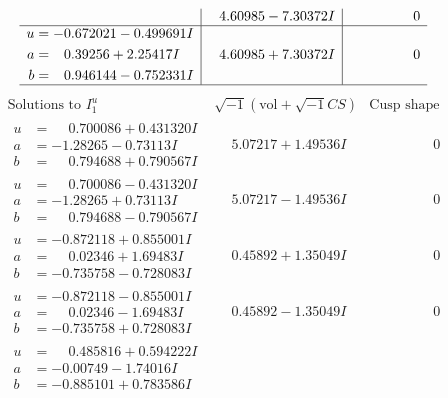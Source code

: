 \documentclass[1p]{elsarticle_modified}
\theoremstyle{definition}
\newcommand{\I}{\sqrt{-1}}
\begin{document}
$$\begin{array}{c|c|c}
 & \phantom{-}4.60985 - 7.30372 I & \phantom{-0.000000 } 0 \\ \hline\begin{aligned}
u &= -0.672021 - 0.499691 I \\
a &= \phantom{-}0.39256 + 2.25417 I \\
b &= \phantom{-}0.946144 - 0.752331 I\end{aligned}
 & \phantom{-}4.60985 + 7.30372 I & \phantom{-0.000000 } 0\\
 \hline 
 \end{array}$$\newpage$$\begin{array}{c|c|c}  
\text{Solutions to }I^u_{1}& \I (\text{vol} + \sqrt{-1}CS) & \text{Cusp shape}\\
 \hline 
\begin{aligned}
u &= \phantom{-}0.700086 + 0.431320 I \\
a &= -1.28265 - 0.73113 I \\
b &= \phantom{-}0.794688 + 0.790567 I\end{aligned}
 & \phantom{-}5.07217 + 1.49536 I & \phantom{-0.000000 } 0 \\ \hline\begin{aligned}
u &= \phantom{-}0.700086 - 0.431320 I \\
a &= -1.28265 + 0.73113 I \\
b &= \phantom{-}0.794688 - 0.790567 I\end{aligned}
 & \phantom{-}5.07217 - 1.49536 I & \phantom{-0.000000 } 0 \\ \hline\begin{aligned}
u &= -0.872118 + 0.855001 I \\
a &= \phantom{-}0.02346 + 1.69483 I \\
b &= -0.735758 - 0.728083 I\end{aligned}
 & \phantom{-}0.45892 + 1.35049 I & \phantom{-0.000000 } 0 \\ \hline\begin{aligned}
u &= -0.872118 - 0.855001 I \\
a &= \phantom{-}0.02346 - 1.69483 I \\
b &= -0.735758 + 0.728083 I\end{aligned}
 & \phantom{-}0.45892 - 1.35049 I & \phantom{-0.000000 } 0 \\ \hline\begin{aligned}
u &= \phantom{-}0.485816 + 0.594222 I \\
a &= -0.00749 - 1.74016 I \\
b &= -0.885101 + 0.783586 I\end{aligned}

\end{array}$$
\end{document}
